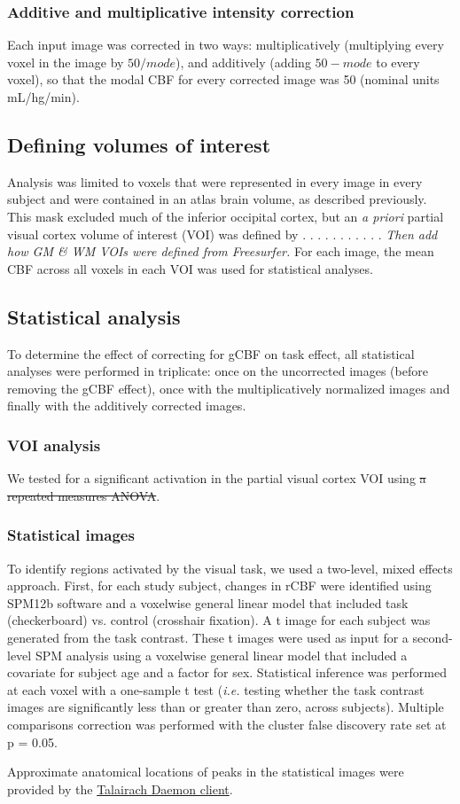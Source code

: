 \subsubsection{Additive and multiplicative intensity correction}
Each input image was corrected in two ways: multiplicatively (multiplying every voxel in the image by $50/mode$), and additively (adding $50-mode$ to every voxel), so that the modal CBF for every corrected image was 50 (nominal units mL/hg/min).

\subsection{Defining volumes of interest}
Analysis was limited to voxels that were represented in every image in every subject and were contained in an atlas brain volume, as described previously.\cite{Black_2010} This mask excluded much of the inferior occipital cortex, but an \textit{a priori} partial visual cortex volume of interest (VOI) was defined by . . . . . . . . . . .  \textit{Then add how GM & WM VOIs were defined from Freesurfer.} For each image, the mean CBF across all voxels in each VOI was used for statistical analyses.

\subsection{Statistical analysis}
To determine the effect of correcting for gCBF on task effect, all statistical analyses were performed in triplicate: once on the uncorrected images (before removing the gCBF effect), once with the multiplicatively normalized images and finally with the additively corrected images.

\subsubsection{VOI analysis}
We tested for a significant activation in the partial visual cortex VOI using \sout{a repeated measures ANOVA}.

\subsubsection{Statistical images}
To identify regions activated by the visual task, we used a two-level, mixed effects approach.  First, for each study subject, changes in rCBF were identified using SPM12b software and a voxelwise general linear model that included task (checkerboard) vs. control (crosshair fixation). A t image for each subject was generated from the task contrast. These t images were used as input for a second-level SPM analysis using a voxelwise general linear model that included a covariate for subject age and a factor for sex. Statistical inference was performed at each voxel with a one-sample t test (\textit{i.e.} testing whether the task contrast images are significantly less than or greater than zero, across subjects). Multiple comparisons correction was performed with the cluster false discovery rate set at p = 0.05. 

Approximate anatomical locations of peaks in the statistical images were provided by the \href{http://www.talairach.org}{Talairach Daemon client}.\cite{20408222}\cite{10912591}
